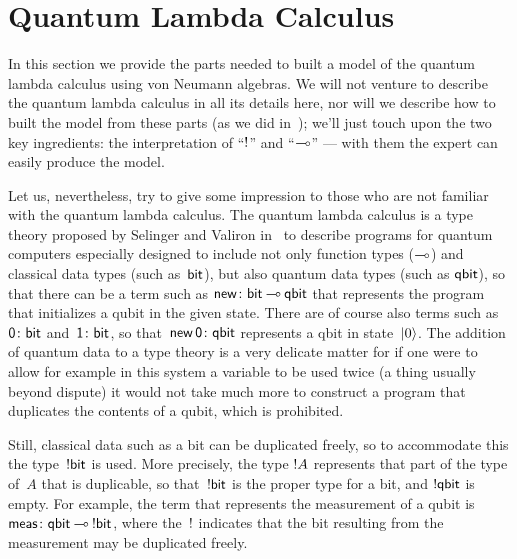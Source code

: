 \documentclass[a]{subfiles}
\begin{document}
\section{Quantum Lambda Calculus}
\begin{parsec}%
\begin{point}%
In this section we provide
the parts needed
to built a model
of the quantum lambda calculus
using von Neumann algebras.
We will not venture
to describe the quantum lambda calculus
in all its details here,
nor will we describe how to built the model
from these parts
(as we did in~\cite{model});
we'll just touch upon
the two key ingredients:
the interpretation of ``$\mathord{!}$'' and ``$\mathbin{\multimap}$''
---
with them the expert
can easily produce the model.

Let us, nevertheless, try to give some impression to those who are not familiar 
with the quantum lambda calculus.
The quantum lambda calculus is a type theory
proposed by Selinger and Valiron in~\cite{selinger2005,selinger2006}
to describe programs for quantum computers
especially designed
to include 
not only
function types ($\mathbin{\multimap}$)
and
classical data types (such as~$\mathsf{bit}$),
but also quantum data types
(such as $\mathsf{qbit}$),
so that there can be a term such as
$\mathsf{new}\colon \mathsf{bit}\mathbin{\multimap} \mathsf{qbit}$
that represents the program
that initializes a qubit in the given state.
There are of course also terms
such as
$\mathsf{0}\colon \mathsf{bit}$
and~$\mathsf{1}\colon \mathsf{bit}$,
so that~$\mathsf{new}\,\mathsf{0}\colon \mathsf{qbit}$
represents a qbit in state~$\ket{0}$.
The addition of quantum data 
to a type theory
is a very delicate matter
for if one were to allow
for example
in this system
a variable to be used twice
(a thing usually beyond dispute)
it would not take much more
to construct
a program
that duplicates the contents
of a qubit,
which is prohibited.

Still, classical data
such as a bit
can be duplicated freely,
so to accommodate this 
the type~$\mathord{!} \mathsf{bit}$ is used.
More precisely,
the type
$\mathord{!} A$
represents that part of the type of~$A$ that is duplicable,
so that~$\mathord{!} \mathsf{bit}$
is the proper type for a bit,
and $\mathord{!}\mathsf{qbit}$ is empty.
For example,
the term that represents the measurement
of a qubit is~$\mathsf{meas}\colon \mathsf{qbit}\mathbin{\multimap} \mathord{!}\mathsf{bit}$,
where the~$\mathord{!}$ indicates that the bit resulting from the measurement
may be duplicated freely.


\end{point}
\end{parsec}
\end{document}
